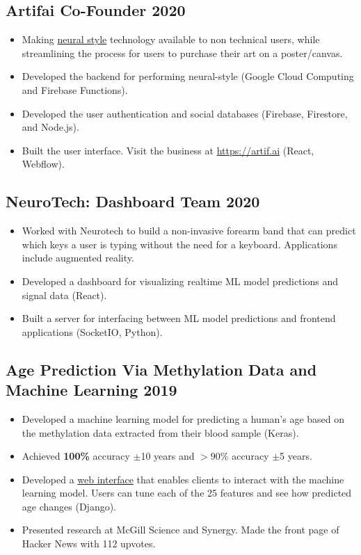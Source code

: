\documentclass{article}
\begin{document}
\subsection{Artifai Co-Founder \hfill 2020}
\begin{itemize}[leftmargin=0.5in]
  \setlength\itemsep{0.00em}
\item Making \href{https://arxiv.org/abs/1508.06576}{neural style} technology available to non technical users, while streamlining the process for users to purchase their art on a poster/canvas.
\item Developed the backend for performing neural-style (Google Cloud Computing and Firebase Functions).
\item Developed the user authentication and social databases (Firebase, Firestore, and Node.js).
\item Built the user interface. Visit the business at \href{https://artif.ai}{https://artif.ai} (React, Webflow).
\end{itemize}

\subsection{NeuroTech: Dashboard Team \hfill 2020}
\begin{itemize}[leftmargin=0.5in]
  \setlength\itemsep{0.00em}
\item Worked with Neurotech to build a non-invasive forearm band that can predict which keys a user is typing without the need for a keyboard. Applications include augmented reality.
\item Developed a dashboard for visualizing realtime ML model predictions and signal data (React).
\item Built a server for interfacing between ML model predictions and frontend applications (SocketIO, Python).
\end{itemize}


\subsection{Age Prediction Via Methylation Data and Machine Learning \hfill 2019}
\begin{itemize}[leftmargin=0.5in]
  \setlength\itemsep{0.00em}
\item Developed a machine learning model for predicting a human's age based on the methylation data extracted from their blood sample (Keras).
\item Achieved \textbf{100\%} accuracy $\pm$10 years and $>90\%$ accuracy $\pm$5 years.
\item Developed a \href{https://epigenosys.com}{web interface} that enables clients to interact with the machine learning model. Users can tune each of the 25 features and see how predicted age changes (Django).
\item Presented research at McGill Science and Synergy. Made the front page of Hacker News with 112 upvotes.
\end{itemize}
\end{document}
